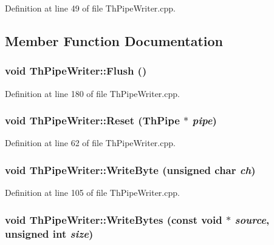 Definition at line 49 of file ThPipeWriter.cpp.

\subsection{Member Function Documentation}
\hypertarget{class_th_pipe_writer_8efce3bace1019be225d62676c0e5f92}{
\subsubsection[{Flush}]{\setlength{\rightskip}{0pt plus 5cm}void ThPipeWriter::Flush ()}}
\label{class_th_pipe_writer_8efce3bace1019be225d62676c0e5f92}




Definition at line 180 of file ThPipeWriter.cpp.\hypertarget{class_th_pipe_writer_60ae27a251766f4d8dd2ee881e3671ef}{
\subsubsection[{Reset}]{\setlength{\rightskip}{0pt plus 5cm}void ThPipeWriter::Reset ({\bf ThPipe} $\ast$ {\em pipe})}}
\label{class_th_pipe_writer_60ae27a251766f4d8dd2ee881e3671ef}




Definition at line 62 of file ThPipeWriter.cpp.\hypertarget{class_th_pipe_writer_51cf562b851763177d3d9ee26ce50245}{
\subsubsection[{WriteByte}]{\setlength{\rightskip}{0pt plus 5cm}void ThPipeWriter::WriteByte (unsigned char {\em ch})}}
\label{class_th_pipe_writer_51cf562b851763177d3d9ee26ce50245}




Definition at line 105 of file ThPipeWriter.cpp.\hypertarget{class_th_pipe_writer_e54cf707b37055a566eb4dbab7b72091}{
\subsubsection[{WriteBytes}]{\setlength{\rightskip}{0pt plus 5cm}void ThPipeWriter::WriteBytes (const void $\ast$ {\em source}, \/  unsigned int {\em size})}}
\label{class_th_pipe_writer_e54cf707b37055a566eb4dbab7b72091}




